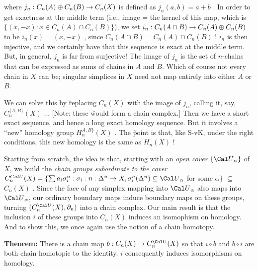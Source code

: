 \ssk


\ssk

where $j_n:C_n(A)\oplus C_n(B) \rightarrow C_n(X)$ is defined as $j_n(a,b)=a+b$ . In order to get exactness
at the middle term (i.e., image = the kernel of this map, which is $\{ (x,-x) : x\in C_n(A)\cap C_n(B)\}$),
we set $i_n:C_n(A\cap B) \rightarrow C_n(A)\oplus C_n(B)$ to be $i_n(x) = (x,-x)$ , since
$C_n(A\cap B) = C_n(A)\cap C_n(B)$ ! $i_n$ is then injective, and we certainly have that
this sequence is exact at the middle term. But, in general, $j_n$ is far from surjective! The image of $j_n$
is the set of $n$-chains that can be expressed as sums of chains in $A$ and $B$. Which of course
not every chain in $X$ can be; singular simplices in $X$ need not map entirely
into either $A$ or $B$. 

\msk

We can solve this by \u{replacing} $C_n(X)$ with the image of $j_n$, calling it, say,
$C_n^{\{A,B\}}(X)$ ... [Note: these \u{would} form a chain complex.]
Then we have a short exact sequence, and hence a long exact homology sequence.
But it involves a ``new'' homology group $H_n^{{A,B}\}}(X)$ . The \u{point} is that, like S-vK,
under the right conditions, this new homology is the same as $H_n(X)$ !

\msk

Starting from scratch, the idea is that, starting with an {\it open cover} $\{{\Cal U}_\alpha\}$
of $X$, we build the {\it chain groups subordinate to the cover} 
$C_n^{Cal U}(X) = \{\sum a_i \sigma_i^n : \sigma_i : n:\Delta^n\ra X , \sigma_i^n(\Delta^n)\subseteq {\Cal U}_\alpha$
for some $\alpha\}$ $\subseteq$ $C_n(X)$ . 
Since the face of any simplex mapping into ${\Cal U}_\alpha$ also maps into ${\Cal U}_\alpha$,
our ordinary boundary maps induce boundary maps on these groups, turning
$(C_n^{\Cal U}(X),\partial_n)$ into a chain complex. Our main result is that the inclusion
$i$ of these groups into $C_n(X)$ induces an isomophism on homology. And to show this, we once
again use the notion of a chain homotopy.

\msk

{\bf Theorem:} There is a chain map $b:C_n(X)\ra C_n^{\Cal U}(X)$ so that $i\circ b$ and $b\circ i$ are both chain 
homotopic to the identity. $i$ consequently induces isomorphisms on homology.

\msk

